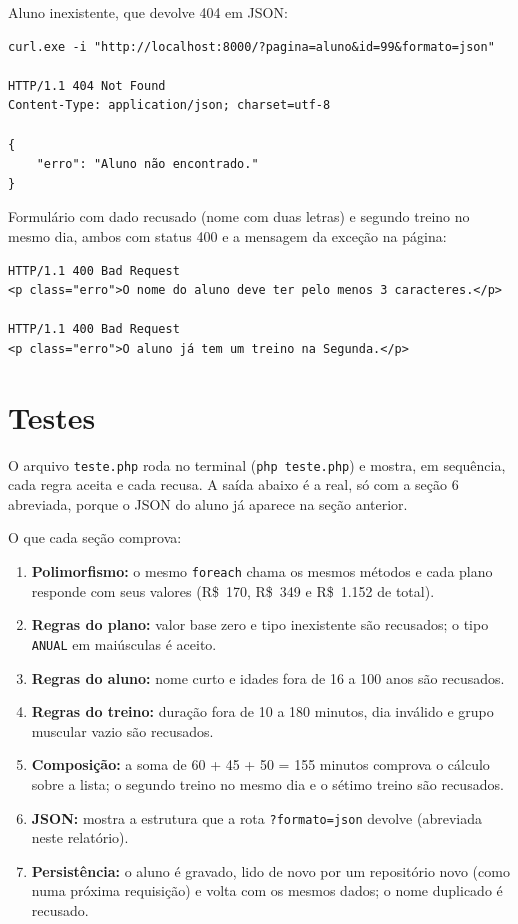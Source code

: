 \documentclass[12pt,a4paper]{article}
\begin{document}
Aluno inexistente, que devolve 404 em JSON:

\begin{lstlisting}
curl.exe -i "http://localhost:8000/?pagina=aluno&id=99&formato=json"

HTTP/1.1 404 Not Found
Content-Type: application/json; charset=utf-8

{
    "erro": "Aluno não encontrado."
}
\end{lstlisting}

Formulário com dado recusado (nome com duas letras) e segundo treino no mesmo dia, ambos com status 400 e a mensagem da exceção na página:

\begin{lstlisting}
HTTP/1.1 400 Bad Request
<p class="erro">O nome do aluno deve ter pelo menos 3 caracteres.</p>

HTTP/1.1 400 Bad Request
<p class="erro">O aluno já tem um treino na Segunda.</p>
\end{lstlisting}

\section{Testes}

O arquivo \texttt{teste.php} roda no terminal (\texttt{php teste.php}) e mostra, em sequência, cada regra aceita e cada recusa. A saída abaixo é a real, só com a seção 6 abreviada, porque o JSON do aluno já aparece na seção anterior.



O que cada seção comprova:

\begin{enumerate}
  \item \textbf{Polimorfismo:} o mesmo \texttt{foreach} chama os mesmos métodos e cada plano responde com seus valores (R\$~170, R\$~349 e R\$~1.152 de total).
  \item \textbf{Regras do plano:} valor base zero e tipo inexistente são recusados; o tipo \texttt{ANUAL} em maiúsculas é aceito.
  \item \textbf{Regras do aluno:} nome curto e idades fora de 16 a 100 anos são recusados.
  \item \textbf{Regras do treino:} duração fora de 10 a 180 minutos, dia inválido e grupo muscular vazio são recusados.
  \item \textbf{Composição:} a soma de 60 + 45 + 50 = 155 minutos comprova o cálculo sobre a lista; o segundo treino no mesmo dia e o sétimo treino são recusados.
  \item \textbf{JSON:} mostra a estrutura que a rota \texttt{?formato=json} devolve (abreviada neste relatório).
  \item \textbf{Persistência:} o aluno é gravado, lido de novo por um repositório novo (como numa próxima requisição) e volta com os mesmos dados; o nome duplicado é recusado.
\end{enumerate}
\end{document}
